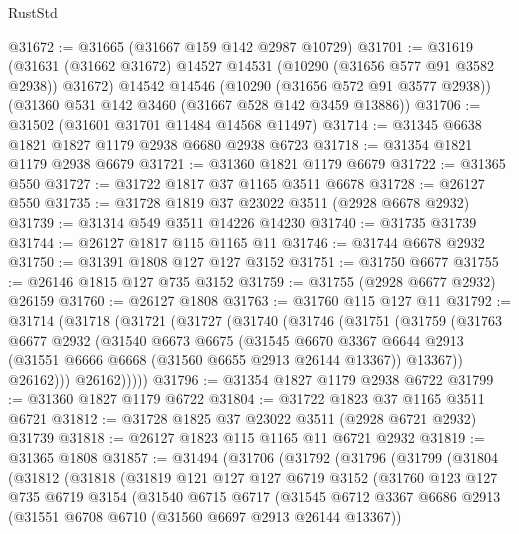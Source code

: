 \begin{lexlean}{RustStd}
\begin{coremodule}
@31672 := @31665 (@31667 @159 @142 @2987 @10729)
@31701 := @31619
    (@31631 (@31662 @31672) @14527 @14531 (@10290 (@31656 @577 @91 @3582 @2938)) @31672)
    @14542
    @14546
    (@10290 (@31656 @572 @91 @3577 @2938))
    (@31360 @531 @142 @3460 (@31667 @528 @142 @3459 @13886))
@31706 := @31502 (@31601 @31701 @11484 @14568 @11497)
@31714 := @31345 @6638 @1821 @1827 @1179 @2938 @6680 @2938 @6723
@31718 := @31354 @1821 @1179 @2938 @6679
@31721 := @31360 @1821 @1179 @6679
@31722 := @31365 @550
@31727 := @31722 @1817 @37 @1165 @3511 @6678
@31728 := @26127 @550
@31735 := @31728 @1819 @37 @23022 @3511 (@2928 @6678 @2932)
@31739 := @31314 @549 @3511 @14226 @14230
@31740 := @31735 @31739
@31744 := @26127 @1817 @115 @1165 @11
@31746 := @31744 @6678 @2932
@31750 := @31391 @1808 @127 @127 @3152
@31751 := @31750 @6677
@31755 := @26146 @1815 @127 @735 @3152
@31759 := @31755 (@2928 @6677 @2932) @26159
@31760 := @26127 @1808
@31763 := @31760 @115 @127 @11
@31792 := @31714
    (@31718
      (@31721
        (@31727
          (@31740
            (@31746
              (@31751
                (@31759
                  (@31763
                    @6677
                    @2932
                    (@31540
                      @6673
                      @6675
                      (@31545
                        @6670
                        @3367
                        @6644
                        @2913
                        (@31551 @6666 @6668 (@31560 @6655 @2913 @26144 @13367))
                        @13367))
                    @26162)))
              @26162)))))
@31796 := @31354 @1827 @1179 @2938 @6722
@31799 := @31360 @1827 @1179 @6722
@31804 := @31722 @1823 @37 @1165 @3511 @6721
@31812 := @31728 @1825 @37 @23022 @3511 (@2928 @6721 @2932) @31739
@31818 := @26127 @1823 @115 @1165 @11 @6721 @2932
@31819 := @31365 @1808
@31857 := @31494
    (@31706
      (@31792
        (@31796
          (@31799
            (@31804
              (@31812
                (@31818
                  (@31819
                    @121
                    @127
                    @127
                    @6719
                    @3152
                    (@31760
                      @123
                      @127
                      @735
                      @6719
                      @3154
                      (@31540
                        @6715
                        @6717
                        (@31545
                          @6712
                          @3367
                          @6686
                          @2913
                          (@31551 @6708 @6710 (@31560 @6697 @2913 @26144 @13367))

\end{coremodule}
\end{lexlean}
